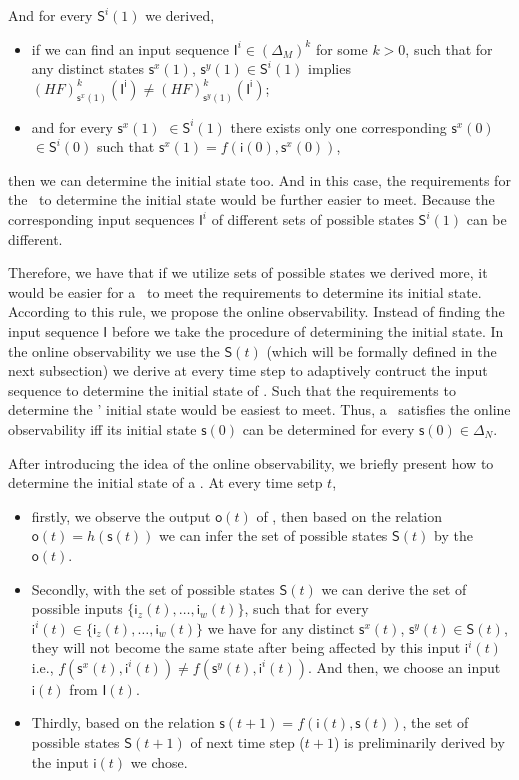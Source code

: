 And for every $\mathsf{S}^{i}(1)$ we derived, 
\begin{itemize}
  \item if we can find an input sequence $\mathsf{I}^{i}\in(\Delta_M)^k$ for some $k>0$, such that for any distinct states $\mathsf{s}^{x}(1)$, $\mathsf{s}^{y}(1) \in \mathsf{S}^{i}(1)$ implies $(HF)^k_{\mathsf{s}^{x}(1)}(\mathsf{I^i})\neq (HF)^k_{\mathsf{s}^{y}(1)}(\mathsf{I^i})$;
  \item  and for every $\mathsf{s}^{x}(1)$ $\in \mathsf{S}^{i}(1)$ there exists only one corresponding $\mathsf{s}^{x}(0)$ $\in \mathsf{S}^{i}(0)$ such that $\mathsf{s}^{x}(1)=f({\mathsf{i}(0)},{\mathsf{s}^{x}(0)})$,
\end{itemize} 
then we can determine the initial state too. And in this case, the requirements for the \BCN\ to determine the initial state would be further easier to meet. Because the corresponding input sequences $\mathsf{I}^{i}$ of different sets of possible states $\mathsf{S}^{i}(1)$ can be different. 

Therefore, we have that if we utilize sets of possible states we derived more, it would be easier for a \BCN\ to meet the requirements to determine its initial state. According to this rule, we propose the online observability. Instead of finding the input sequence $\mathsf{I}$ before we take the procedure of determining the initial state. In the online observability we use the $\mathsf{S}(t)$ (which will be formally defined in the next subsection) we derive at every time step to adaptively contruct the input sequence to determine the initial state of \BCNs. Such that the requirements to determine the \BCNs' initial state would be easiest to meet. Thus, a \BCN\ satisfies the online observability iff its initial state $\mathsf{s}(0)$ can be determined for every $\mathsf{s}(0) \in \Delta_N$.

After introducing the idea of the online observability, we briefly present how to determine the initial state of a \BCN. At every time setp $t$, 
\begin{itemize}
\item firstly, we observe the output $\mathsf{o}(t)$ of \BCN, then based on the relation $\mathsf{o}(t)=h(\mathsf{s}(t))$ we can infer the set of possible states $\mathsf{S}(t)$ by the $\mathsf{o}(t)$.
\item Secondly, with the set of possible states $\mathsf{S}(t)$ we can derive the set of possible inputs $\{\mathsf{i}_z(t),\ldots,\mathsf{i}_w(t)\}$, such that for every $\mathsf{i}^{i}(t)\in \{\mathsf{i}_z(t),\ldots,\mathsf{i}_w(t)\}$ we have  for any distinct $\mathsf{s}^{x}(t)$, $\mathsf{s}^{y}(t) \in \mathsf{S}(t)$, they will not become the same state after being affected by this input $\mathsf{i}^{i}(t)$ i.e., $f(\mathsf{s}^{x}(t), \mathsf{i}^{i}(t))\neq f(\mathsf{s}^{y}(t),\mathsf{i}^{i}(t))$.  And then, we choose an input $\mathsf{i}(t)$ from $\mathsf{I}(t)$.
\item Thirdly, based on the relation $\mathsf{s}(t+1)= f({\mathsf{i}(t)},{\mathsf{s}(t)})$, the set of possible states $\mathsf{S}(t+1)$ of next time step ($t+1$) is preliminarily derived by the input $\mathsf{i}(t)$ we chose. 
\end{itemize} 

